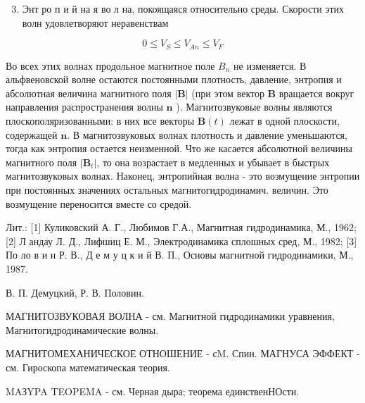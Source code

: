 \documentclass[10pt]{article}
\begin{document}
\begin{enumerate}

  \setcounter{enumi}{2}

  \item Энт ро п и й на я во л на, покоящаяся относительно среды. Скорости этих волн удовлетворяют неравенствам

\end{enumerate}



\[

0 \leqslant V_{S} \leqslant V_{A n} \leqslant V_{F}

\]



Во всех этих волнах продольное магнитное поле $B_{n}$ не изменяется. В альфвеновской волне остаются постоянными плотность, давление, энтропия и абсолютная величина магнитного поля $|\boldsymbol{B}|$ (при этом вектор $\boldsymbol{B}$ вращается вокруг направления распространения волны $\boldsymbol{n}$ ). Магнитозвуковые волны являются плоскополяризованными: в них все векторы $\boldsymbol{B}(t)$ лежат в одной плоскости, содержащей $\boldsymbol{n}$. В магнитозвуковых волнах плотность и давление уменьшаются, тогда как энтропия остается неизменной. Что же касается абсолютной величины магнитного поля $\left|\boldsymbol{B}_{t}\right|$, то она возрастает в медленных и убывает в быстрых магнитозвуковых волнах. Наконец, энтропийная волна - это возмущение энтропии при постоянных значениях остальных магнитогидродинамич. величин. Это возмущение переносится вместе со средой.



Лит.: [1] Куликовский А. Г., Любимов Г.А., Магнитная гидродинамика, М., 1962; [2] Л андау Л. Д., Лифшиц Е. М., Электродинамика сплошных сред, М., 1982; [3] По ло в и н Р. В., Д е м у ц к и й В. П., Основы магнитной гидродинамики, М., 1987.



В. П. Демуцкий, Р. В. Половин.



МАГНИТОЗВУКОВАЯ ВОЛНА - см. Магнитной гидродинамики уравнения, Магнитогидродинамические волны.



МАГНИТОМЕХАНИЧЕСКОЕ ОТНОШЕНИЕ - сM. Спин. МАГНУСА ЭФФЕКТ - см. Гироскопа математическая теория.



MAЗYPA TEOPEMA - см. Черная дыра; теорема единственНОсти.
\end{document}
